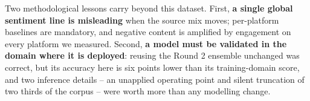 \documentclass[11pt,a4paper]{article}
\begin{document}
Two methodological lessons carry beyond this dataset. First, \textbf{a single global sentiment line is misleading} when the source mix moves; per-platform baselines are mandatory, and negative content is amplified by engagement on every platform we measured. Second, \textbf{a model must be validated in the domain where it is deployed}: reusing the Round 2 ensemble unchanged was correct, but its accuracy here is six points lower than its training-domain score, and two inference details -- an unapplied operating point and silent truncation of two thirds of the corpus -- were worth more than any modelling change.
\end{document}
